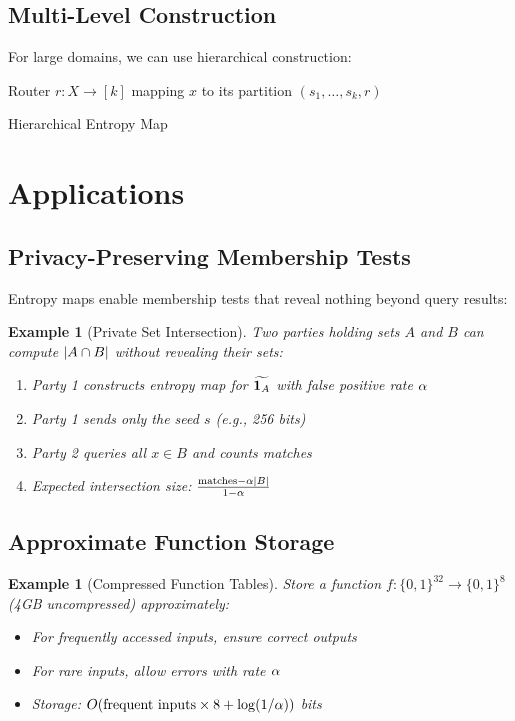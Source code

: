 \documentclass[11pt,final,hidelinks]{article}
\newtheorem{example}[theorem]{Example}
\begin{document}
\subsection{Multi-Level Construction}

For large domains, we can use hierarchical construction:

\begin{algorithm}[H]
\SetAlgoLined
{}
Router $r: X \to [k]$ mapping $x$ to its partition\;
\Return $(s_1, \ldots, s_k, r)$\;
\caption{Hierarchical Entropy Map}
\end{algorithm}

\section{Applications}

\subsection{Privacy-Preserving Membership Tests}

Entropy maps enable membership tests that reveal nothing beyond query results:

\begin{example}[Private Set Intersection]
Two parties holding sets $A$ and $B$ can compute $\lvert A \cap B\rvert$ without revealing their sets:
\begin{enumerate}
    \item Party 1 constructs entropy map for $\widetilde{\mathbf{1}_{A}}$ with false positive rate $\alpha$
    \item Party 1 sends only the seed $s$ (e.g., 256 bits)
    \item Party 2 queries all $x \in B$ and counts matches
    \item Expected intersection size: $\frac{\text{matches} - \alpha \lvert B\rvert}{1 - \alpha}$
\end{enumerate}
\end{example}

\subsection{Approximate Function Storage}

\begin{example}[Compressed Function Tables]
Store a function $f: \{0,1\}^{32} \to \{0,1\}^8$ (4GB uncompressed) approximately:
\begin{itemize}
    \item For frequently accessed inputs, ensure correct outputs
    \item For rare inputs, allow errors with rate $\alpha$
    \item Storage: $O(\text{frequent inputs} \times 8 + \log(1/\alpha))$ bits
\end{itemize}
\end{example}
\end{document}
